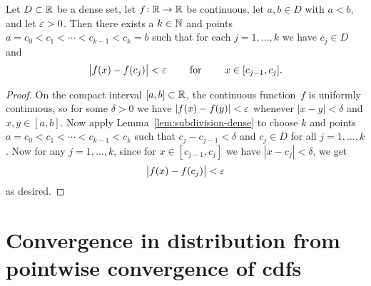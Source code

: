 \begin{lemma}
  \label{lem:continuous-function-approximation-subdivision}
  Let $D \subset \mathbb{R}$ be a dense set, let $f \colon \mathbb{R} \to \mathbb{R}$ be continuous,
  let $a, b \in D$ with $a < b$, and let $\varepsilon > 0$.
  Then there exists a $k \in \mathbb{N}$ and points
  $a=c_0 < c_1 < \cdots < c_{k-1} < c_k = b$ such that for
  each $j = 1, \ldots, k$ we have $c_j \in D$ and
  \begin{align*}
  \big| f(x) - f(c_j) \big| < \varepsilon
  \qquad \text{ for } \qquad x \in [c_{j-1} , c_j] .
  \end{align*}
\end{lemma}
\begin{proof}
  On the compact interval
  $[a,b] \subset \mathbb{R}$, the continuous function~$f$ is uniformly continuous, so for some
  $\delta > 0 $ we have $|f(x)-f(y)|<\varepsilon$ whenever $|x-y|<\delta$ and $x,y \in
  [a,b]$.
  Now apply Lemma~\ref{lem:subdivision-dense} to choose $k$ and points
  $a=c_0 < c_1 < \cdots < c_{k-1} < c_k$ such that $c_j - c_{j-1} < \delta$
  and $c_j \in D$ for all $j = 1 , \ldots , k$.
  Now for any $j = 1 , \ldots , k$, since for $x \in [c_{j-1} , c_j]$ we have
  $|x - c_j| < \delta$, we get
  \begin{align*}
  \big| f(x) - f(c_j) \big| < \varepsilon
  \end{align*}
  as desired.
\end{proof}

\section{Convergence in distribution from pointwise convergence of cdfs}

